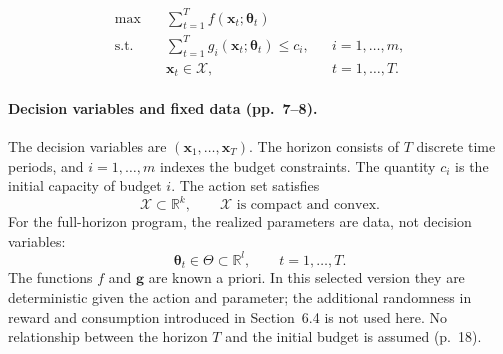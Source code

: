 \documentclass{article}
\begin{document}
\begin{equation}
\begin{aligned}
\max\quad & \sum_{t=1}^{T} f(\boldsymbol{x}_t;\boldsymbol{\theta}_t) \\
\text{s.t.}\quad & \sum_{t=1}^{T} g_i(\boldsymbol{x}_t;\boldsymbol{\theta}_t)\le c_i,
&& i=1,\ldots,m, \\
& \boldsymbol{x}_t\in\mathcal{X},
&& t=1,\ldots,T.
\end{aligned}
\tag{PCP}
\end{equation}

\paragraph{Decision variables and fixed data (pp.~7--8).}
The decision variables are $(\boldsymbol{x}_1,\ldots,\boldsymbol{x}_T)$. The horizon consists of $T$ discrete time periods, and $i=1,\ldots,m$ indexes the budget constraints. The quantity $c_i$ is the initial capacity of budget $i$. The action set satisfies
\[
\mathcal{X}\subset\mathbb{R}^{k},\qquad
\mathcal{X}\text{ is compact and convex}.
\]
For the full-horizon program, the realized parameters are data, not decision variables:
\[
\boldsymbol{\theta}_t\in\Theta\subset\mathbb{R}^{l},
\qquad t=1,\ldots,T.
\]
The functions $f$ and $\boldsymbol{g}$ are known a priori. In this selected version they are deterministic given the action and parameter; the additional randomness in reward and consumption introduced in Section~6.4 is not used here. No relationship between the horizon $T$ and the initial budget is assumed (p.~18).
\end{document}
